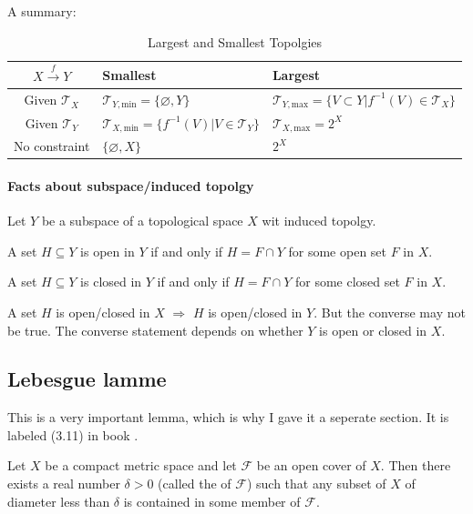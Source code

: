A summary:
\begin{table}[H]
    \centering
    \caption{Largest and Smallest Topolgies}
    \begin{tabular}{c l l}
        $X\overset{f}{\to}Y$ & Smallest  &Largest \\
        \hline
        Given $\mathcal{T}_X$ & $\mathcal{T}_{Y,\text{min}}=\{\varnothing,Y\}$        & $\mathcal{T}_{Y,\text{max}}=\{ V\subset Y| f^{-1}(V)\in \mathcal{T}_X\}$\\
        Given $\mathcal{T}_Y$ & $\mathcal{T}_{X,\text{min}}=\{f^{-1}(V)|V\in\mathcal{T}_Y\}$ & $\mathcal{T}_{X,\text{max}}=2^X$ \\
        No constraint & $\{\varnothing,X\}$ & $2^X$ \\
        \hline
    \end{tabular}
\end{table}
\paragraph{Facts about subspace/induced topolgy}
Let $Y$ be a subspace of a topological space $X$ wit induced topolgy.
\begin{fact}
    A set $H\subseteq Y$ is open in $Y$ if and only if $H=F\cap Y$
    for some open set $F$ in $X$.
\end{fact}
\begin{fact}
    A set $H\subseteq Y$ is closed in $Y$ if and only if $H=F\cap Y$
    for some closed set $F$ in $X$.
\end{fact}
\begin{fact}
    A set $H$ is open/closed in $X$ $\Rightarrow$ $H$ is open/closed
    in $Y$. But the converse may not be true. The converse statement
    depends on whether $Y$ is open or closed in $X$.
\end{fact}

\subsection{Lebesgue lamme}
\label{sec:Lebesgue lamme}

This is a very important lemma, which is why I gave it a seperate
section. It is labeled (3.11) in book \cite{book}.
\begin{thm}
    \label{lemma:lebesgue-lemma} 
    Let $X$ be a compact metric space and let $\mathscr{F}$ be an open
    cover of $X$. Then there exists a real number $\delta>0$ (called
    the  of $\mathscr{F}$) such that any subset
    of $X$ of diameter less than $\delta$ is contained in some member
    of $\mathscr{F}$.
\end{thm}
